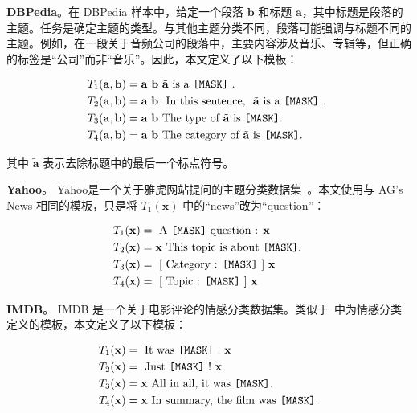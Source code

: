 \textbf{DBPedia}。在 DBPedia 样本中，给定一个段落 $\mathbf{b}$ 和标题 $\mathbf{a}$，其中标题是段落的主题。任务是确定主题的类型。与其他主题分类不同，段落可能强调与标题不同的主题。例如，在一段关于音频公司的段落中，主要内容涉及音乐、专辑等，但正确的标签是“公司”而非“音乐”。因此，本文定义了以下模板：

{\centering
\begin{mybox2}
\begin{align*}
     T_1(\mathbf{a},\mathbf{b}) &=  \mathbf{a} \ \mathbf{b}  \  \tilde{\mathbf{a}}  \text{ is a \texttt{[MASK]} . }\\
      T_2(\mathbf{a},\mathbf{b}) &=  \mathbf{a} \   \mathbf{b}  \  \text{ In this sentence, } \  \tilde{\mathbf{a}}  \text{ is a \texttt{[MASK]} . } \\
   T_3(\mathbf{a},\mathbf{b}) &=   \mathbf{a}\ \mathbf{b} \  \text{The type of}\  \tilde{\mathbf{a}} \ \text{is}\  \texttt{[MASK]} .\\
   T_4(\mathbf{a},\mathbf{b}) &=\mathbf{a}\ \mathbf{b} \ \text{The category of}\  \tilde{\mathbf{a}} \ \text{is}\ \texttt{[MASK]} .
\end{align*}
\end{mybox2}
}
其中 $\tilde{\mathbf{a}}$ 表示去除标题中的最后一个标点符号。

\textbf{Yahoo}。 Yahoo是一个关于雅虎网站提问的主题分类数据集~\cite{zhang2015character}。本文使用与 AG's News 相同的模板，只是将 $T_1(\mathbf{x})$ 中的“news”改为“question”：

{\centering
\begin{mybox}
\begin{align*}
     T_1(\mathbf{x})  &= \text{ A \texttt{[MASK]} question : }  \mathbf{x}  \\
     T_2(\mathbf{x})  &= \mathbf{x} \text{ This topic is about \texttt{[MASK]}. }\\
     T_3(\mathbf{x})   &= \text{ [ Category : \texttt{[MASK]} ] }  \mathbf{x}  \\
     T_4(\mathbf{x})   &=\text{ [ Topic : \texttt{[MASK]} ] } \mathbf{x} 
\end{align*}
\end{mybox}
}

\textbf{IMDB}。 IMDB 是一个关于电影评论的情感分类数据集。类似于~\cite{schick2020exploiting}中为情感分类定义的模板，本文定义了以下模板：

{\centering
\begin{mybox3}
\begin{align*}
       T_1(\mathbf{x}) & = \text{ It was \texttt{[MASK]} . } \mathbf{x}\\
    T_2(\mathbf{x}) &  = \text{ Just \texttt{[MASK]} ! } \mathbf{x}\\
      T_3(\mathbf{x}) & = \mathbf{x} \text{ All in all, it was } \texttt{[MASK]} . \\
      T_4(\mathbf{x}) & = \mathbf{x} \text{ In summary, the film was } \texttt{[MASK]}.  
\end{align*}
\end{mybox3}
}

